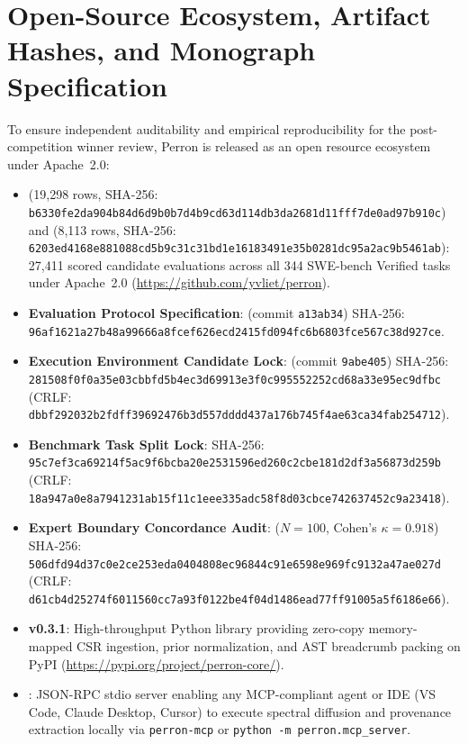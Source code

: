 \documentclass[10pt]{article}
\begin{document}
\section{Open-Source Ecosystem, Artifact Hashes, and Monograph Specification}
\label{app:ecosystem_specification}

To ensure independent auditability and empirical reproducibility for the post-competition winner review, Perron is released as an open resource ecosystem under Apache~2.0:
\begin{itemize}[noitemsep,topsep=2pt,parsep=0pt,partopsep=0pt]\raggedright\sloppy
    \item \textbf{} (19,298 rows, SHA-256: \nolinkurl{b6330fe2da904b84d6d9b0b7d4b9cd63d114db3da2681d11fff7de0ad97b910c}) and \textbf{} (8,113 rows, SHA-256: \nolinkurl{6203ed4168e881088cd5b9c31c31bd1e16183491e35b0281dc95a2ac9b5461ab}): 27,411 scored candidate evaluations across all 344 SWE-bench Verified tasks under Apache~2.0 (\url{https://github.com/yvliet/perron}).
    \item \textbf{Evaluation Protocol Specification}:  (commit \texttt{a13ab34}) SHA-256: \nolinkurl{96af1621a27b48a99666a8fcef626ecd2415fd094fc6b6803fce567c38d927ce}.
    \item \textbf{Execution Environment Candidate Lock}:  (commit \texttt{9abe405}) SHA-256: \nolinkurl{281508f0f0a35e03cbbfd5b4ec3d69913e3f0c995552252cd68a33e95ec9dfbc} (CRLF: \nolinkurl{dbbf292032b2fdff39692476b3d557dddd437a176b745f4ae63ca34fab254712}).
    \item \textbf{Benchmark Task Split Lock}:  SHA-256: \nolinkurl{95c7ef3ca69214f5ac9f6bcba20e2531596ed260c2cbe181d2df3a56873d259b} (CRLF: \nolinkurl{18a947a0e8a7941231ab15f11c1eee335adc58f8d03cbce742637452c9a23418}).
    \item \textbf{Expert Boundary Concordance Audit}:  ($N=100$, Cohen's $\kappa=0.918$) SHA-256: \nolinkurl{506dfd94d37c0e2ce253eda0404808ec96844c91e6598e969fc9132a47ae027d} (CRLF: \nolinkurl{d61cb4d25274f6011560cc7a93f0122be4f04d1486ead77ff91005a5f6186e66}).
    \item \textbf{ v0.3.1}: High-throughput Python library providing zero-copy memory-mapped CSR ingestion, prior normalization, and AST breadcrumb packing on PyPI (\url{https://pypi.org/project/perron-core/}).
    \item \textbf{}: JSON-RPC stdio server enabling any MCP-compliant agent or IDE (VS Code, Claude Desktop, Cursor) to execute spectral diffusion and provenance extraction locally via \texttt{perron-mcp} or \texttt{python -m perron.mcp\_server}.

\end{itemize}
\end{document}

